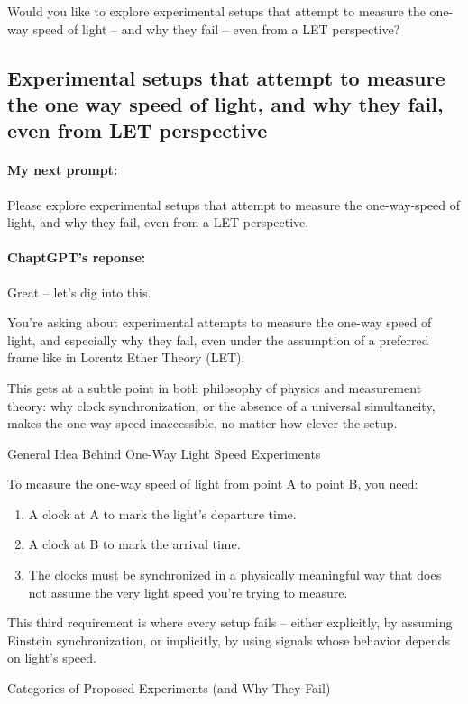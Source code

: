 \documentclass[a4paper]{article}
\theoremstyle{plain}
\theoremstyle{definition}
\begin{document}
Would you like to explore experimental setups that attempt to measure
the one-way speed of light -- and why they fail -- even from a LET
perspective?


\subsection{Experimental setups that attempt to measure the one way speed of light, and why they fail, even from LET perspective}

\paragraph{My next prompt:}

Please explore experimental setups that attempt to measure the
one-way-speed of light, and why they fail, even from a LET
perspective.

\paragraph{ChaptGPT's reponse:}

Great -- let's dig into this.

You're asking about experimental attempts to measure the one-way speed
of light, and especially why they fail, even under the assumption of a
preferred frame like in Lorentz Ether Theory (LET).

This gets at a subtle point in both philosophy of physics and
measurement theory: why clock synchronization, or the absence of a
universal simultaneity, makes the one-way speed inaccessible, no
matter how clever the setup.

General Idea Behind One-Way Light Speed Experiments

To measure the one-way speed of light from point A to point B, you
need:
\begin{enumerate}
\item A clock at A to mark the light's departure time.
\item A clock at B to mark the arrival time.
\item The clocks must be synchronized in a physically meaningful way
  that does not assume the very light speed you're trying to measure.
\end{enumerate}
This third requirement is where every setup fails -- either
explicitly, by assuming Einstein synchronization, or implicitly, by
using signals whose behavior depends on light's speed.

Categories of Proposed Experiments (and Why They Fail)
\end{document}
